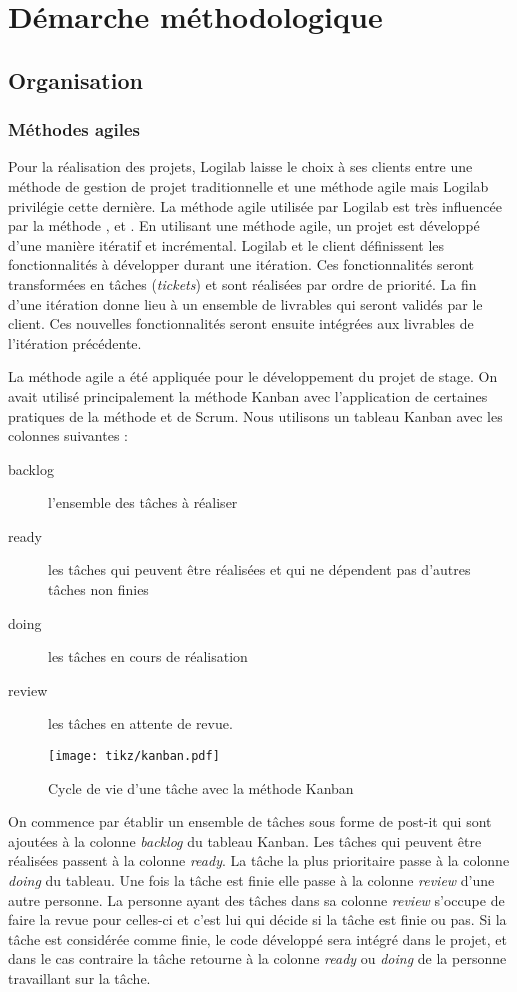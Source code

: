 \chapter{Démarche méthodologique}
\section{Organisation}
\subsection{Méthodes agiles}
Pour la réalisation des projets, Logilab laisse le choix  à ses clients entre une méthode de gestion de projet traditionnelle et une méthode agile mais Logilab privilégie cette dernière. La méthode agile utilisée par Logilab est très influencée par la méthode ,  et . En utilisant une méthode agile, un projet est développé d'une manière itératif et incrémental. Logilab et le client définissent les fonctionnalités à développer durant une itération. Ces fonctionnalités seront transformées en tâches (\textit{tickets}) et sont réalisées par ordre de priorité. La fin d'une itération donne lieu à un ensemble de livrables qui seront validés par le client. Ces nouvelles fonctionnalités seront ensuite intégrées aux livrables de l'itération précédente.

La méthode agile a été appliquée pour le développement du projet de stage. On avait utilisé principalement la méthode Kanban avec l'application de certaines pratiques de la méthode  et de Scrum. Nous utilisons un tableau Kanban avec les colonnes suivantes : 
\begin{description}
	\item[backlog] l'ensemble des tâches à réaliser
	\item[ready] les tâches qui peuvent être réalisées et qui ne dépendent pas d'autres tâches non finies
	\item[doing] les tâches en cours de réalisation
	\item[review] les tâches en attente de revue.
\end{description}
\begin{figure}
\centering
  \texttt{[image: tikz/kanban.pdf]}
  \caption{Cycle de vie d'une tâche avec la méthode Kanban}
  \label{fig:kanban}
\end{figure}
On commence par établir un ensemble de tâches sous forme de post-it qui sont ajoutées à la colonne \textit{backlog} du tableau Kanban. Les tâches qui peuvent être réalisées passent à la colonne \textit{ready}. La tâche la plus prioritaire passe à la colonne \textit{doing} du tableau. Une fois la tâche est finie elle passe à la colonne \textit{review} d'une autre personne. La personne ayant des tâches dans sa colonne \textit{review} s'occupe de faire la revue pour celles-ci et c'est lui qui décide si la tâche est finie ou pas. Si la tâche est considérée comme finie, le code développé sera intégré dans le projet, et dans le cas contraire la tâche retourne à la colonne \textit{ready} ou \textit{doing} de la personne travaillant sur la tâche. 

